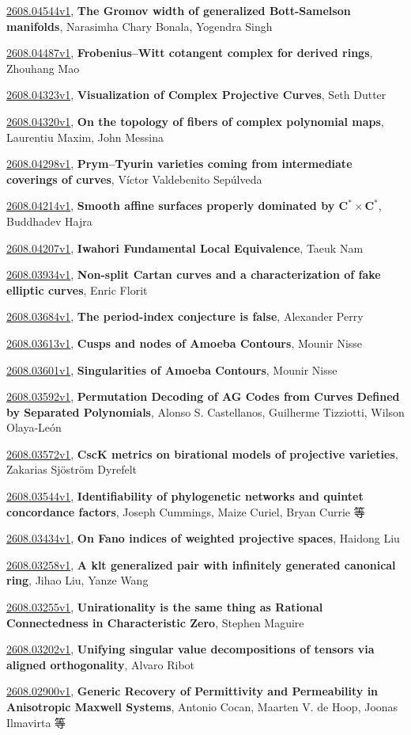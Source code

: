 \documentclass[9pt, a4paper]{article}
\theoremstyle{plain}
\theoremstyle{definition}
\theoremstyle{remark}
\newcommand{\arxiv}[3]{\href{https://arxiv.org/abs/#1}{#1}, \textbf{\textcolor{arxivblue}{#2}}, #3}
\begin{document}
\arxiv{2608.04544v1}{The Gromov width of generalized Bott-Samelson manifolds}{Narasimha Chary Bonala, Yogendra Singh}

\arxiv{2608.04487v1}{Frobenius--Witt cotangent complex for derived rings}{Zhouhang Mao}

\arxiv{2608.04323v1}{Visualization of Complex Projective Curves}{Seth Dutter}

\arxiv{2608.04320v1}{On the topology of fibers of complex polynomial maps}{Laurentiu Maxim, John Messina}

\arxiv{2608.04298v1}{Prym--Tyurin varieties coming from intermediate coverings of curves}{Víctor Valdebenito Sepúlveda}

\arxiv{2608.04214v1}{Smooth affine surfaces properly dominated by $\mathbf{C}^*\times\mathbf{C}^*$}{Buddhadev Hajra}

\arxiv{2608.04207v1}{Iwahori Fundamental Local Equivalence}{Taeuk Nam}

\arxiv{2608.03934v1}{Non-split Cartan curves and a characterization of fake elliptic curves}{Enric Florit}

\arxiv{2608.03684v1}{The period-index conjecture is false}{Alexander Perry}

\arxiv{2608.03613v1}{Cusps and nodes of Amoeba Contours}{Mounir Nisse}

\arxiv{2608.03601v1}{Singularities of Amoeba Contours}{Mounir Nisse}

\arxiv{2608.03592v1}{Permutation Decoding of AG Codes from Curves Defined by Separated Polynomials}{Alonso S. Castellanos, Guilherme Tizziotti, Wilson Olaya-León}

\arxiv{2608.03572v1}{CscK metrics on birational models of projective varieties}{Zakarias Sjöström Dyrefelt}

\arxiv{2608.03544v1}{Identifiability of phylogenetic networks and quintet concordance factors}{Joseph Cummings, Maize Curiel, Bryan Currie 等}

\arxiv{2608.03434v1}{On Fano indices of weighted projective spaces}{Haidong Liu}

\arxiv{2608.03258v1}{A klt generalized pair with infinitely generated canonical ring}{Jihao Liu, Yanze Wang}

\arxiv{2608.03255v1}{Unirationality is the same thing as Rational Connectedness in Characteristic Zero}{Stephen Maguire}

\arxiv{2608.03202v1}{Unifying singular value decompositions of tensors via aligned orthogonality}{Alvaro Ribot}

\arxiv{2608.02900v1}{Generic Recovery of Permittivity and Permeability in Anisotropic Maxwell Systems}{Antonio Cocan, Maarten V. de Hoop, Joonas Ilmavirta 等}
\end{document}

